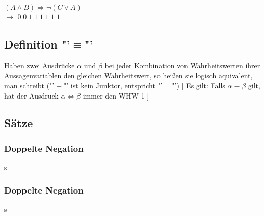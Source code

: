 \documentclass[10pt,a4paper,titlepage,fleqn]{article}
\begin{document}
\subsubsection{}
	$(A\wedge B)\Rightarrow \neg (C\vee A)$\\
	\quad $\rightarrow$ \; $0\;0\;1\;1\;1\;1\;1\;1$
\subsection{Definition "'$\equiv$"'}
	 Haben zwei Ausdrücke $\alpha$ und $\beta$ bei jeder 
	Kombination von Wahrheitswerten ihrer Aussagenvariablen den gleichen Wahrheitswert,
	so heißen sie \underline{\textsf{logisch äquivalent}}, man schreibt 
	\framebox[1.3\width]{$\alpha \equiv\beta$} ("'$\equiv$"' ist kein Junktor, 
	entspricht "'$=$"') [ Es gilt: Falls $\alpha \equiv\beta$ gilt, hat der Ausdruck 
	$\alpha \Leftrightarrow\beta$ immer den WHW 1 ]
\subsection{Sätze}
\subsubsection{Doppelte Negation}
s
\subsubsection{Doppelte Negation}
s
\end{document}

